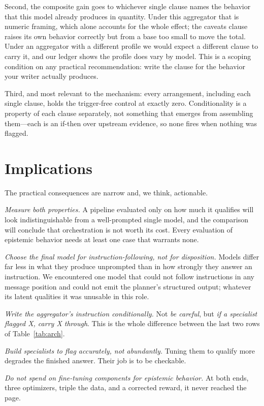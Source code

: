 \documentclass[11pt]{article}
\begin{document}
Second, the composite gain goes to whichever single clause names the behavior
that this model already produces in quantity. Under this aggregator that is
numeric framing, which alone accounts for the whole effect; the caveats clause
raises its own behavior correctly but from a base too small to move the total.
Under an aggregator with a different profile we would expect a different
clause to carry it, and our ledger shows the profile does vary by model. This
is a scoping condition on any practical recommendation: write the clause for
the behavior your writer actually produces.

Third, and most relevant to the mechanism: every arrangement, including each
single clause, holds the trigger-free control at exactly zero. Conditionality
is a property of each clause separately, not something that emerges from
assembling them---each is an if-then over upstream evidence, so none fires
when nothing was flagged.

\section{Implications}
The practical consequences are narrow and, we think, actionable.

\emph{Measure both properties.} A pipeline evaluated only on how much it
qualifies will look indistinguishable from a well-prompted single model, and
the comparison will conclude that orchestration is not worth its cost. Every
evaluation of epistemic behavior needs at least one case that warrants none.

\emph{Choose the final model for instruction-following, not for disposition.}
Models differ far less in what they produce unprompted than in how strongly
they answer an instruction. We encountered one model that could not follow
instructions in any message position and could not emit the planner's
structured output; whatever its latent qualities it was unusable in this role.

\emph{Write the aggregator's instruction conditionally.} Not \emph{be
careful}, but \emph{if a specialist flagged X, carry X through}. This is the
whole difference between the last two rows of Table~\ref{tab:arch}.

\emph{Build specialists to flag accurately, not abundantly.} Tuning them to
qualify more degrades the finished answer. Their job is to be checkable.

\emph{Do not spend on fine-tuning components for epistemic behavior.} At both
ends, three optimizers, triple the data, and a corrected reward, it never
reached the page.
\end{document}

